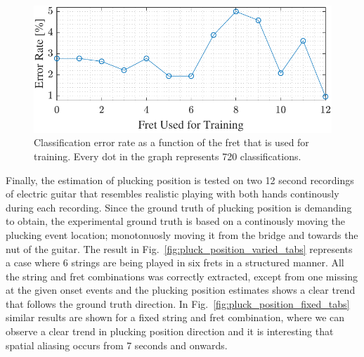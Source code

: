 \documentclass{article}
\begin{document}
\begin{figure}[htbp]
  \centering %
  \centerline{\includegraphics[width=.95\columnwidth]{img/errorRate_vs_frets}}%
  \caption{Classification error rate as a function of the fret that is used for training. Every  dot in the graph represents 720 classifications.}\label{fig:err_vs_frets}
\end{figure}%
%
%
%
%
Finally, the estimation of plucking position is tested on two 12 second recordings of electric guitar that resembles realistic playing with both hands continously during each recording. Since the ground truth of plucking position is demanding to obtain, the experimental ground truth is based on a continously moving the plucking event location; monotonuosly moving it from the bridge and towards the nut of the guitar. The result in Fig.~\ref{fig:pluck_position_varied_tabs} represents a case where 6 strings are being played in six frets in a structured manner. All the string and fret combinations was correctly extracted, except from one missing at the given onset events and the plucking position estimates shows a clear trend that follows the ground truth direction. In Fig.~\ref{fig:pluck_position_fixed_tabs} similar results are shown for a fixed string and fret combination, where we can observe a clear trend in plucking position direction and it is interesting that spatial aliasing occurs from 7 seconds and onwards. %
%
%
%
%
%
%
\end{document}
